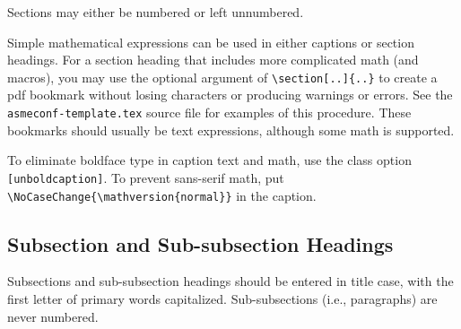 \documentclass[colorlinks,upint,subscriptcorrection,varvw,balance,loadscripts,german,vietamese]{asmeconf} %
\begin{document}
Sections may either be numbered or left unnumbered.

Simple mathematical expressions can be used in either captions or section headings. For a section heading that includes more complicated math (and macros), you may use the optional argument of \verb|\section[..]{..}| to create a pdf bookmark without losing characters or producing warnings or errors. See the \texttt{asmeconf-template.tex} source file for examples of this procedure. These bookmarks should usually be text expressions, although some math is supported.  

To eliminate boldface type in caption text and math, use the class option \texttt{[unboldcaption]}.  To prevent sans-serif math, put \verb|\NoCaseChange{\mathversion{normal}}| in the caption.

\subsection{Subsection and Sub-subsection Headings}

Subsections and sub-subsection headings should be entered in title case, with the first letter of primary words capitalized. Sub-subsections (i.e., paragraphs) are never numbered.




\begin{table}[t]
\caption[Table]{A simple table}\label{tab:1}
\end{table}


\end{document}
